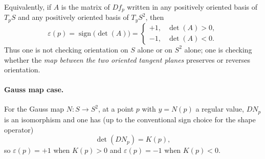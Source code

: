 \documentclass[12pt,a4paper]{article}
\theoremstyle{plain}
\theoremstyle{definition}      %
\begin{document}
	Equivalently, if $A$ is the matrix of $Df_p$ written in any positively oriented basis of $T_pS$
	and any positively oriented basis of $T_yS^{2}$, then
	\[
	\varepsilon(p)=\operatorname{sign}\bigl(\det(A)\bigr)
	=
	\begin{cases}
		+1,& \det(A)>0,\\
		-1,& \det(A)<0.
	\end{cases}
	\]
	Thus one is not checking orientation on $S$ alone or on $S^{2}$ alone; one is checking whether
	the \emph{map between the two oriented tangent planes} preserves or reverses orientation.
	
	\paragraph{Gauss map case.}
	For the Gauss map $N\colon S\to S^{2}$, at a point $p$ with $y=N(p)$ a regular value,
	$DN_p$ is an isomorphism and one has (up to the conventional sign choice for the shape operator)
	\[
	\det(DN_p)=K(p),
	\]
	so $\varepsilon(p)=+1$ when $K(p)>0$ and $\varepsilon(p)=-1$ when $K(p)<0$.
	
	
	
\end{document}
